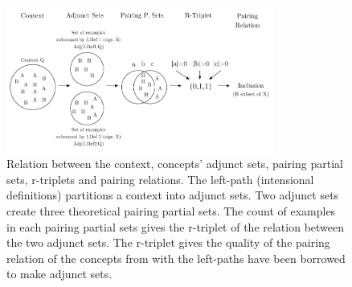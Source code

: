 \begin{figure}
    \centering
    \includegraphics[width = 250pt]{figs/5.pdf}
    \caption{Relation between the context, concepts' adjunct sets, pairing partial sets, r-triplets and pairing relations. The left-path (intensional definitions) partitions a context into adjunct sets. Two adjunct sets create three theoretical pairing partial sets. The count of examples in each pairing partial sets gives the r-triplet of the relation between the two adjunct sets. The r-triplet gives the quality of the pairing relation of the concepts from with the left-paths have been borrowed to make adjunct sets.}
    \label{fig:pRelations}
\end{figure}

